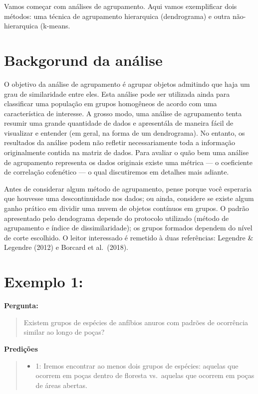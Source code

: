 \documentclass[
]{book}
\providecommand{\tightlist}{%
  \setlength{\itemsep}{0pt}\setlength{\parskip}{0pt}}
\begin{document}
Vamos começar com análises de agrupamento. Aqui vamos exemplificar dois métodos: uma técnica de agrupamento hierarquica (dendrograma) e outra não-hierarquica (k-means.

\hypertarget{backgorund-da-anuxe1lise}{%
\section{Backgorund da análise}\label{backgorund-da-anuxe1lise}}

O objetivo da análise de agrupamento é agrupar objetos admitindo que haja um grau de similaridade entre eles. Esta análise pode ser utilizada ainda para classificar uma população em grupos homogêneos de acordo com uma característica de interesse. A grosso modo, uma análise de agrupamento tenta resumir uma grande quantidade de dados e apresentála de maneira fácil de visualizar e entender (em geral, na forma de um dendrograma). No entanto, os resultados da análise podem não refletir necessariamente toda a informação originalmente contida na matriz de dados. Para avaliar o quão bem uma análise de agrupamento representa os dados originais existe uma métrica --- o coeficiente de correlação cofenético --- o qual discutiremos em detalhes mais adiante.

Antes de considerar algum método de agrupamento, pense porque você esperaria que houvesse uma descontinuidade nos dados; ou ainda, considere se existe algum ganho prático em dividir uma nuvem de objetos contínuos em grupos. O padrão apresentado pelo dendograma depende do protocolo utilizado (método de agrupamento e índice de dissimilaridade); os grupos formados dependem do nível de corte escolhido. O leitor interessado é remetido à duas referências: Legendre \& Legendre (2012) e Borcard et al.~(2018).

\hypertarget{exemplo-1}{%
\section{Exemplo 1:}\label{exemplo-1}}

\textbf{Pergunta:}

\begin{quote}
Existem grupos de espécies de anfíbios anuros com padrões de ocorrência similar ao longo de poças?
\end{quote}

\textbf{Predições}

\begin{quote}
\begin{itemize}
\tightlist
\item
  1: Iremos encontrar ao menos dois grupos de espécies: aquelas que ocorrem em poças dentro de floresta vs.~aquelas que ocorrem em poças de áreas abertas.
\end{itemize}
\end{quote}
\end{document}
